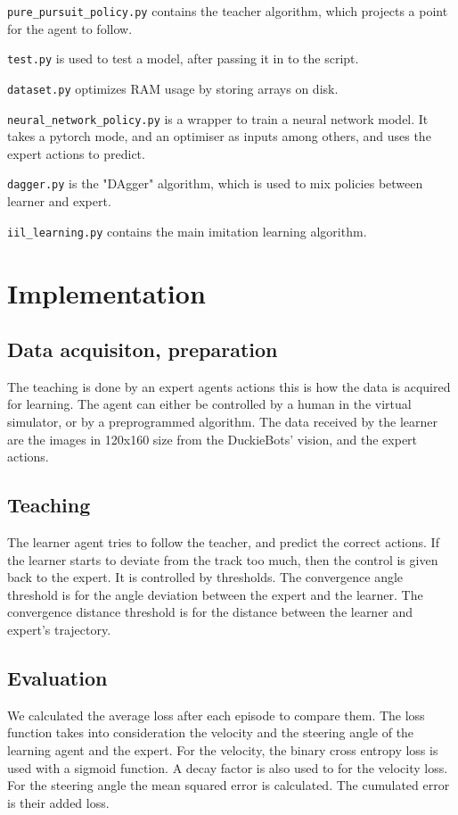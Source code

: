 \documentclass{article}
\begin{document}
\verb|pure_pursuit_policy.py| contains the teacher algorithm, which projects a point for the agent to follow. 

\verb|test.py| is used to test a model, after passing it in to the script. 

\verb|dataset.py| optimizes RAM usage by storing arrays on disk. 

\verb|neural_network_policy.py| is a wrapper to train a neural network model. It takes a pytorch mode, and an optimiser as inputs among others, and uses the expert actions to predict. 

\verb|dagger.py| is the "DAgger" algorithm, which is used to mix policies between learner and expert. 

\verb|iil_learning.py| contains the main imitation learning algorithm. 

\section{Implementation}

\subsection{Data acquisiton, preparation}

The teaching is done by an expert agents actions this is how the data is acquired for learning. The agent can either be controlled by a human in the virtual simulator, or by a preprogrammed algorithm. The data received by the learner are the images in 120x160 size from the DuckieBots' vision, and the expert actions. 

\subsection{Teaching}

The learner agent tries to follow the teacher, and predict the correct actions. If the learner starts to deviate from the track too much, then the control is given back to the expert. It is controlled by thresholds. The convergence angle threshold is for the angle deviation between the expert and the learner. The convergence distance threshold is for the distance between the learner and expert's trajectory.

\subsection{Evaluation}


We calculated the average loss after each episode to compare them. The loss function takes into consideration the velocity and the steering angle of the learning agent and the expert. For the velocity, the binary cross entropy loss is used with a sigmoid function. A decay factor is also used to for the velocity loss.  For the steering angle the mean squared error is calculated. The cumulated error is their added loss.
\end{document}
